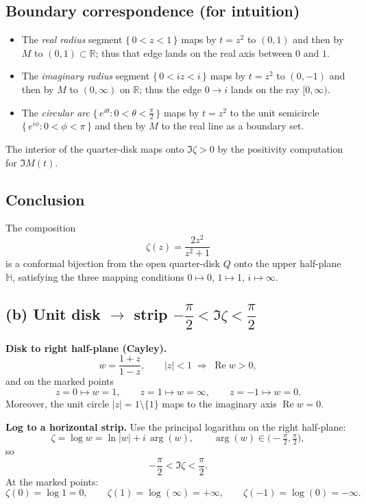 \documentclass[11pt]{article}
\begin{document}
	\subsection*{Boundary correspondence (for intuition)}
	\begin{itemize}
		\item The \emph{real radius} segment $\{\,0<z<1\,\}$ maps by $t=z^{2}$ to $(0,1)$ and then by $M$
		to $(0,1)\subset\mathbb R$; thus that edge lands on the real axis between $0$ and $1$.
		\item The \emph{imaginary radius} segment $\{\,0<iz<i\,\}$ maps by $t=z^{2}$ to $(0,-1)$ and then by $M$
		to $(0,\infty)$ on $\mathbb R$; thus the edge $0\to i$ lands on the ray $[0,\infty)$.
		\item The \emph{circular arc} $\{\,e^{i\theta}: 0<\theta<\tfrac{\pi}{2}\,\}$ maps by $t=z^{2}$ to the unit
		semicircle $\{\,e^{i\phi}: 0<\phi<\pi\,\}$ and then by $M$ to the real line as a boundary set.
	\end{itemize}
	The interior of the quarter-disk maps onto $\Im\zeta>0$ by the positivity computation for $\Im M(t)$.
	
	\subsection*{Conclusion}
	The composition
	\[
	\boxed{\ \zeta(z)=\frac{2z^{2}}{z^{2}+1}\ }
	\]
	is a conformal bijection from the open quarter-disk $Q$ onto the upper half-plane $\mathbb H$,
	satisfying the three mapping conditions $0\mapsto0$, $1\mapsto1$, $i\mapsto\infty$.
	
	
	
	\subsection*{(b) Unit disk $\to$ strip $-\dfrac{\pi}{2}<\Im\zeta<\dfrac{\pi}{2}$}
	
	\textbf{Disk to right half-plane (Cayley).}
	\[
	w=\frac{1+z}{1-z},\qquad |z|<1 \;\Longrightarrow\; \operatorname{Re} w>0,
	\]
	and on the marked points
	\[
	z=0 \mapsto w=1,\qquad z=1 \mapsto w=\infty,\qquad z=-1 \mapsto w=0.
	\]
	Moreover, the unit circle $|z|=1\setminus\{1\}$ maps to the imaginary axis $\operatorname{Re} w=0$.
	
	\medskip
	\textbf{Log to a horizontal strip.}
	Use the principal logarithm on the right half-plane:
	\[
	\zeta=\log w=\ln|w|+i\,\arg(w),\qquad \arg(w)\in\big(-\tfrac{\pi}{2},\tfrac{\pi}{2}\big),
	\]
	so
	\[
	-\frac{\pi}{2} < \Im \zeta < \frac{\pi}{2}.
	\]
	At the marked points:
	\[
	\zeta(0)=\log 1=0,\qquad
	\zeta(1)=\log(\infty)=+\infty,\qquad
	\zeta(-1)=\log(0)=-\infty.
	\]
	
\end{document}
